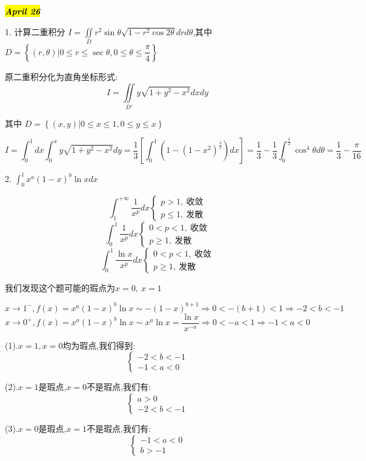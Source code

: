 \hl{\textbf{\textit{April 26}}}

1. 计算二重积分 $I=\iint\limits_{D}r^2\sin\theta\sqrt{1-r^2\cos 2\theta}drd\theta$,其中 $D=\left\lbrace(r,\theta)|0\leq r\leq \sec \theta,0\leq \theta\leq\dfrac{\pi}{4} \right\rbrace $
\begin{solution}
	
	原二重积分化为直角坐标形式: 
	$$I=\iint\limits_{D'}y\sqrt{1+y^2-x^2}dxdy$$
	
	其中 $D=\left\lbrace(x,y)|0\leq x\leq 1,0\leq y\leq x \right\rbrace $
	
	$$I=\int_{0}^{1}dx\int_{0}^{x}y\sqrt{1+y^2-x^2}dy=\frac{1}{3}\left[ \int_{0}^{1}(1-(1-x^2)^{\frac{3}{2}})dx\right]=\frac{1}{3}-\frac{1}{3}\int_{0}^{\frac{\pi}{2}}\cos^4 \theta d\theta=\frac{1}{3}-\frac{\pi}{16} $$
\end{solution}


2. $\int_{0}^{1}x^{a}(1-x)^{b}\ln xdx$
\begin{lemma}[特殊反常积分]\label{lem: 特殊反常积分}
	
	$$\int_{1}^{+\infty}\dfrac{1}{x^p}dx\left\lbrace 
	\begin{array}{l}
		p>1,\ \text{收敛}\\
		p\leq 1,\ \text{发散}
	\end{array}
	\right. $$
	$$\int_{0}^{1}\dfrac{1}{x^p}dx\left\lbrace 
	\begin{array}{l}
		0<p<1,\ \text{收敛}\\
		p\geq 1,\ \text{发散}
	\end{array}
	\right. $$
	$$\int_{0}^{1}\dfrac{\ln x}{x^p}dx\left\lbrace 
	\begin{array}{l}
		0<p<1,\ \text{收敛}\\
		p\geq 1,\ \text{发散}
	\end{array}
	\right. $$
\end{lemma}
\begin{solution}
	
	我们发现这个题可能的瑕点为$x=0,\ x=1$
	
	$$x\rightarrow 1^{-},f(x)=x^a(1-x)^b\ln x\sim -(1-x)^{b+1}\Rightarrow 0<-(b+1)<1\Rightarrow -2<b<-1$$
	$$x\rightarrow 0^{+},f(x)=x^a(1-x)^b\ln x\sim x^a\ln x=\dfrac{\ln x}{x^{-a}}\Rightarrow 0<-a<1\Rightarrow -1<a<0$$
	
	(1).$x=1,x=0$均为瑕点,我们得到: 
	$$\left\lbrace 
	\begin{array}{l}
		-2<b<-1\\
		-1<a<0
	\end{array}
	\right. $$
	
	(2).$x=1$是瑕点,$x=0$不是瑕点,我们有: 
	$$\left\lbrace 
	\begin{array}{l}
		a>0\\-2<b<-1
	\end{array}
	\right. $$
	
	(3).$x=0$是瑕点,$x=1$不是瑕点,我们有: 
	$$\left\lbrace 
	\begin{array}{l}
		-1<a<0\\b>-1
	\end{array}
	\right. $$
\end{solution}

